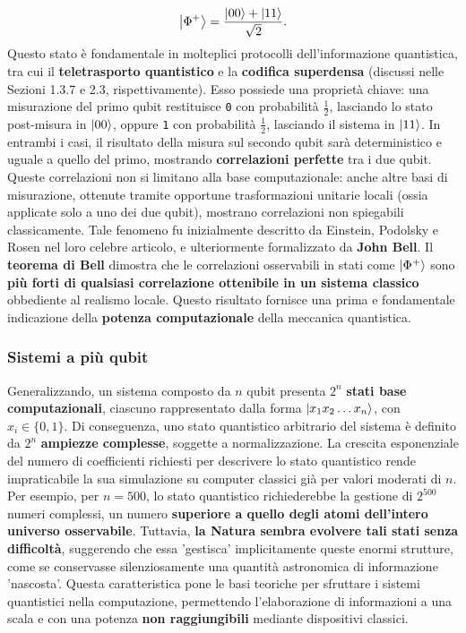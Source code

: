 \documentclass[a4paper,12pt]{report}
\theoremstyle{plain}
\begin{document}
\begin{equation}
\ket{\Phi^+} = \frac{\ket{00} + \ket{11}}{\sqrt{2}}.
\end{equation}
Questo stato è fondamentale in molteplici protocolli dell'informazione quantistica, tra cui il \textbf{teletrasporto quantistico} e la \textbf{codifica superdensa} (discussi nelle Sezioni 1.3.7 e 2.3, rispettivamente). Esso possiede una proprietà chiave: una misurazione del primo qubit restituisce \texttt{0} con probabilità $\frac{1}{2}$, lasciando lo stato post-misura in $\ket{00}$, oppure \texttt{1} con probabilità $\frac{1}{2}$, lasciando il sistema in $\ket{11}$. In entrambi i casi, il risultato della misura sul secondo qubit sarà deterministico e uguale a quello del primo, mostrando \textbf{correlazioni perfette} tra i due qubit.
Queste correlazioni non si limitano alla base computazionale: anche altre basi di misurazione, ottenute tramite opportune trasformazioni unitarie locali (ossia applicate solo a uno dei due qubit), mostrano correlazioni non spiegabili classicamente. Tale fenomeno fu inizialmente descritto da Einstein, Podolsky e Rosen nel loro celebre articolo, e ulteriormente formalizzato da \textbf{John Bell}. Il \textbf{teorema di Bell} dimostra che le correlazioni osservabili in stati come $\ket{\Phi^+}$ sono \textbf{più forti di qualsiasi correlazione ottenibile in un sistema classico} obbediente al realismo locale. Questo risultato fornisce una prima e fondamentale indicazione della \textbf{potenza computazionale} della meccanica quantistica.
\subsubsection*{Sistemi a più qubit}
Generalizzando, un sistema composto da $n$ qubit presenta $2^n$ \textbf{stati base computazionali}, ciascuno rappresentato dalla forma $\ket{x_1 x_2 \ldots x_n}$, con $x_i \in \{0,1\}$. Di conseguenza, uno stato quantistico arbitrario del sistema è definito da $2^n$ \textbf{ampiezze complesse}, soggette a normalizzazione.
La crescita esponenziale del numero di coefficienti richiesti per descrivere lo stato quantistico rende impraticabile la sua simulazione su computer classici già per valori moderati di $n$. Per esempio, per $n = 500$, lo stato quantistico richiederebbe la gestione di $2^{500}$ numeri complessi, un numero \textbf{superiore a quello degli atomi dell'intero universo osservabile}. Tuttavia, \textbf{la Natura sembra evolvere tali stati senza difficoltà}, suggerendo che essa 'gestisca' implicitamente queste enormi strutture, come se conservasse silenziosamente una quantità astronomica di informazione 'nascosta'.
Questa caratteristica pone le basi teoriche per sfruttare i sistemi quantistici nella computazione, permettendo l'elaborazione di informazioni a una scala e con una potenza \textbf{non raggiungibili} mediante dispositivi classici.
\end{document}
